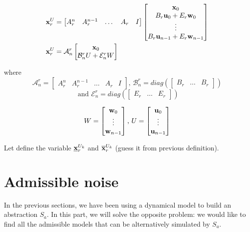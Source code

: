 \documentclass{article}
\theoremstyle{named}
\begin{document}
\newcommand{\An}{\mathcal{A}^r_n}
\newcommand{\Bn}{\mathcal{B}^r_n}
\newcommand{\En}{\mathcal{E}^r_n}
\begin{align} \label{expr:xur}
\xu &=
\begin{bmatrix}
A_r^n & A_r^{n-1} &\dots & A_r & I
\end{bmatrix}
\begin{bmatrix}
\x_0 \\
B_r \u_0 + E_r \w_0\\
\vdots \\
B_r \u_{n-1} + E_r \w_{n-1}\\
\end{bmatrix}\\
\xu &=
\An
\begin{bmatrix}
\x_0 \\
\Bn U + \En W
\end{bmatrix}
\end{align}

where
$$
\An = 
\begin{bmatrix}
A_r^n & A_r^{n-1} &\dots & A_r & I
\end{bmatrix}
\textrm{, }
\Bn =
diag( 
\begin{bmatrix}
B_r &
\dots &
B_r
\end{bmatrix})
$$
$$\textrm{ and }
\En = 
diag(\begin{bmatrix}
E_r &
\dots &
E_r
\end{bmatrix} )
$$

$$
W = \begin{bmatrix}
 \mathbf{w}_0\\
\vdots\\
 \mathbf{w}_{n-1}
\end{bmatrix}
\textrm{, }
U = \begin{bmatrix}
 \mathbf{u}_0\\
\vdots\\
 \mathbf{u}_{n-1}
\end{bmatrix}
$$

\newcommand{\xuki}{\minf{\x}^{U_k}_r}
\newcommand{\xuks}{\msup{\x}^{U_k}_r}
\newcommand{\xuk}{\x^{U_k}_r}
Let define the variable $\xuki$ and $\xuks$ (guess it from previous definition).

\section{Admissible noise}
In the previous sections, we have been using a dynamical model to build an abstraction $S_a$. In this part, we will solve the opposite problem:  we would like to find all the admissible models that can be alternatively simulated by $S_a$.
\end{document}
